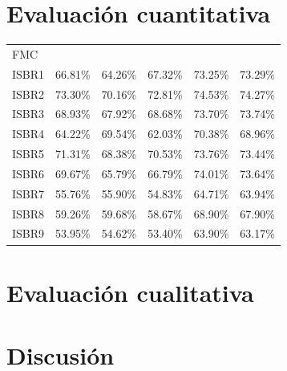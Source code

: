 \section{Evaluación cuantitativa}
\begin{table}[h]
	\begin{tabular}{
			>{\columncolor[HTML]{BBDAFF}}l lllll}
		FMC   & \cellcolor[HTML]{BBDAFF} & \cellcolor[HTML]{BBDAFF} & \cellcolor[HTML]{BBDAFF} & \cellcolor[HTML]{BBDAFF} & \cellcolor[HTML]{BBDAFF} \\
		ISBR1 & 66.81\%                  & 64.26\%                  & 67.32\%                  & 73.25\%                  & 73.29\%                  \\
		ISBR2 & 73.30\%                  & 70.16\%                  & 72.81\%                  & 74.53\%                  & 74.27\%                  \\
		ISBR3 & 68.93\%                  & 67.92\%                  & 68.68\%                  & 73.70\%                  & 73.74\%                  \\
		ISBR4 & 64.22\%                  & 69.54\%                  & 62.03\%                  & 70.38\%                  & 68.96\%                  \\
		ISBR5 & 71.31\%                  & 68.38\%                  & 70.53\%                  & 73.76\%                  & 73.44\%                  \\
		ISBR6 & 69.67\%                  & 65.79\%                  & 66.79\%                  & 74.01\%                  & 73.64\%                  \\
		ISBR7 & 55.76\%                  & 55.90\%                  & 54.83\%                  & 64.71\%                  & 63.94\%                  \\
		ISBR8 & 59.26\%                  & 59.68\%                  & 58.67\%                  & 68.90\%                  & 67.90\%                  \\
		ISBR9 & 53.95\%                  & 54.62\%                  & 53.40\%                  & 63.90\%                  & 63.17\%                 
	\end{tabular}
\end{table}
\section{Evaluación cualitativa}
\section{Discusión}